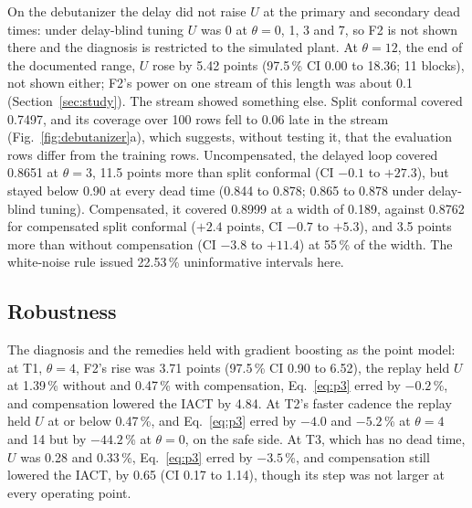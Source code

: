 On the debutanizer the delay did not raise $U$ at the primary and secondary dead times: under
delay-blind tuning $U$ was 0 at $\theta = 0$, 1, 3 and 7, so F2 is not shown there and the
diagnosis is restricted to the simulated plant. At $\theta = 12$, the end of the documented range, $U$ rose by
5.42 points (97.5\,\% CI 0.00 to 18.36; 11 blocks), not shown either; F2's power on one stream of
this length was about 0.1 (Section~\ref{sec:study}). The stream showed something else. Split
conformal covered 0.7497, and its coverage over 100 rows fell to 0.06 late in the stream
(Fig.~\ref{fig:debutanizer}a), which suggests, without testing it, that the evaluation rows
differ from the training rows. Uncompensated, the delayed loop covered 0.8651 at $\theta = 3$,
11.5 points more than split conformal (CI $-0.1$ to $+27.3$), but stayed below 0.90 at every dead
time (0.844 to 0.878; 0.865 to 0.878 under delay-blind tuning). Compensated, it covered 0.8999 at a width of 0.189, against 0.8762 for
compensated split conformal ($+2.4$ points, CI $-0.7$ to $+5.3$), and 3.5 points more than without
compensation (CI $-3.8$ to $+11.4$) at 55\,\% of the width. The white-noise rule issued 22.53\,\%
uninformative intervals here.

\subsection{Robustness}\label{sec:results:robustness}

The diagnosis and the remedies held with gradient boosting as the point model: at T1, $\theta =
4$, F2's rise was 3.71 points (97.5\,\% CI 0.90 to 6.52), the replay held $U$ at 1.39\,\% without and
0.47\,\% with compensation, Eq.~\eqref{eq:p3} erred by $-0.2$\,\%, and compensation lowered the
IACT by 4.84. At T2's faster cadence the replay held $U$ at or below 0.47\,\%, and
Eq.~\eqref{eq:p3} erred by $-4.0$ and $-5.2$\,\% at $\theta = 4$ and 14 but by $-44.2$\,\% at
$\theta = 0$, on the safe side. At T3, which has no dead time, $U$ was 0.28 and 0.33\,\%,
Eq.~\eqref{eq:p3} erred by $-3.5$\,\%, and compensation still lowered the IACT, by 0.65 (CI 0.17 to
1.14), though its step was not larger at every operating point.

